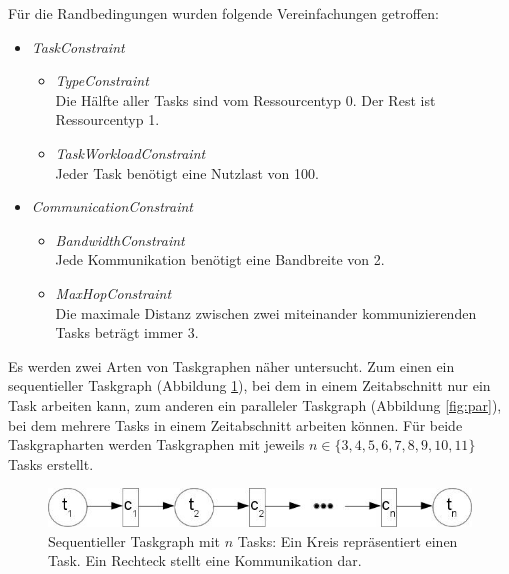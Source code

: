 Für die Randbedingungen wurden folgende Vereinfachungen getroffen:
\begin{itemize}
\item \textit{TaskConstraint}
\begin{itemize}
\item \textit{TypeConstraint}\\
Die Hälfte aller Tasks sind vom Ressourcentyp 0. Der Rest ist Ressourcentyp 1.
\item \textit{TaskWorkloadConstraint} \\
Jeder Task benötigt eine Nutzlast von 100.
\end{itemize}
\newpage
\item \textit{CommunicationConstraint}
\begin{itemize}
\item \textit{BandwidthConstraint}\\
Jede Kommunikation benötigt eine Bandbreite von 2.
\item \textit{MaxHopConstraint}\\
Die maximale Distanz zwischen zwei miteinander kommunizierenden Tasks beträgt immer 3.
\end{itemize}
\end{itemize}

Es werden zwei Arten von Taskgraphen näher untersucht. Zum einen ein sequentieller Taskgraph (Abbildung \ref{fig:seq}), bei dem  in einem Zeitabschnitt nur ein Task arbeiten kann, zum anderen ein paralleler Taskgraph (Abbildung \ref{fig:par}), bei dem mehrere Tasks in einem Zeitabschnitt arbeiten können. Für beide Taskgrapharten werden Taskgraphen mit jeweils $n \in \{ 3, 4, 5, 6, 7, 8, 9, 10, 11\}$ Tasks erstellt.
\begin{figure}[H]\centering
  \includegraphics[width = 120mm]{bilder/sequentiell.jpg}
  \caption{Sequentieller Taskgraph mit $n$ Tasks: Ein Kreis repräsentiert einen Task. Ein Rechteck stellt eine Kommunikation dar.
  }\label{fig:seq}
\end{figure}

